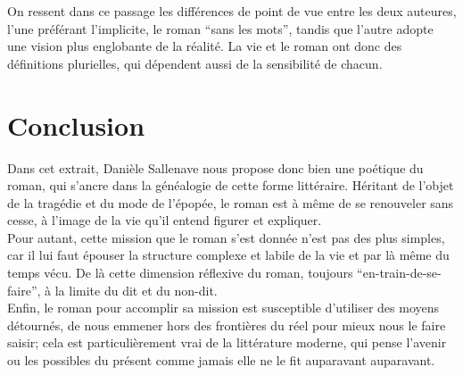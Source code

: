 \documentclass[a4paper,10pt]{article}
\begin{document}
			On ressent dans ce passage les différences de point de vue entre les deux auteures, l'une préférant l'implicite, le roman ``sans les mots'', tandis que l'autre adopte une vision plus englobante de la réalité. La vie et le roman ont donc des définitions plurielles, qui dépendent aussi de la sensibilité de chacun.
			
			
		
	\section*{Conclusion}
		Dans cet extrait, Danièle Sallenave nous propose donc bien une poétique du roman, qui s'ancre dans la généalogie de cette forme littéraire. Héritant de l'objet de la tragédie et du mode de l'épopée, le roman est à même de se renouveler sans cesse, à l'image de la vie qu'il entend figurer et expliquer.\\
		Pour autant, cette mission que le roman s'est donnée n'est pas des plus simples, car il lui faut épouser la structure complexe et labile de la vie et par là même du temps vécu. De là cette dimension réflexive du roman, toujours ``en-train-de-se-faire'', à la limite du dit et du non-dit.\\
		Enfin, le roman pour accomplir sa mission est susceptible d'utiliser des moyens détournés, de nous emmener hors des frontières du réel pour mieux nous le faire saisir; cela est particulièrement vrai de la littérature moderne, qui pense l'avenir ou les possibles du présent comme jamais elle ne le fit auparavant auparavant. 
		

\medskip
\newpage


\end{document}
